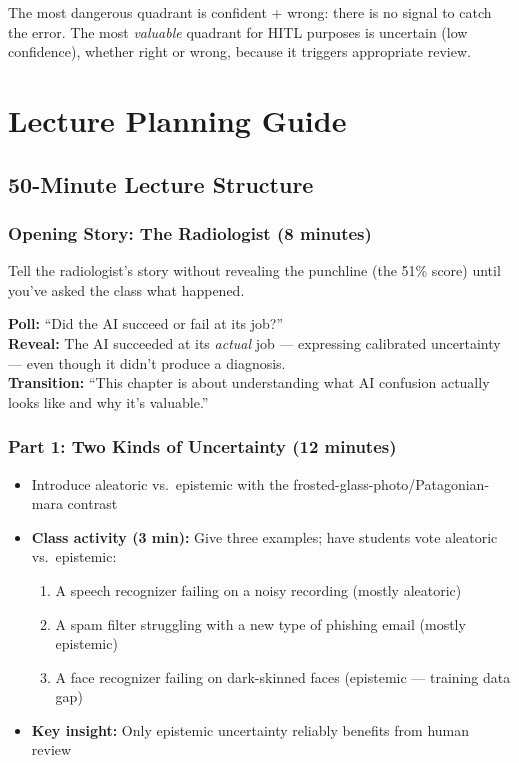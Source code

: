 The most dangerous quadrant is confident + wrong: there is no signal to catch the error. The most \emph{valuable} quadrant for HITL purposes is uncertain (low confidence), whether right or wrong, because it triggers appropriate review.

\section{Lecture Planning Guide}

\subsection{50-Minute Lecture Structure}

\subsubsection{Opening Story: The Radiologist (8 minutes)}

Tell the radiologist's story without revealing the punchline (the 51\% score) until you've asked the class what happened.

\begin{trythis}
\textbf{Poll:} ``Did the AI succeed or fail at its job?''\\[0.5em]
\textbf{Reveal:} The AI succeeded at its \emph{actual} job --- expressing calibrated uncertainty --- even though it didn't produce a diagnosis.\\[0.5em]
\textbf{Transition:} ``This chapter is about understanding what AI confusion actually looks like and why it's valuable.''
\end{trythis}

\subsubsection{Part 1: Two Kinds of Uncertainty (12 minutes)}

\begin{itemize}
    \item Introduce aleatoric vs.\ epistemic with the frosted-glass-photo/Patagonian-mara contrast
    \item \textbf{Class activity (3 min):} Give three examples; have students vote aleatoric vs.\ epistemic:
    \begin{enumerate}
        \item A speech recognizer failing on a noisy recording (mostly aleatoric)
        \item A spam filter struggling with a new type of phishing email (mostly epistemic)
        \item A face recognizer failing on dark-skinned faces (epistemic --- training data gap)
    \end{enumerate}
    \item \textbf{Key insight:} Only epistemic uncertainty reliably benefits from human review
\end{itemize}

